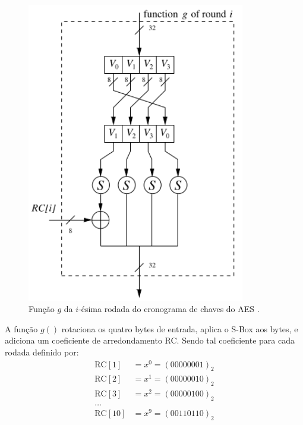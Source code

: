 \begin{frame}[allowframebreaks]
 \framebreak

\begin{figure}[h]
\centering
\includegraphics[width=0.85\textwidth,height=0.65\textheight,keepaspectratio]{figures/AES-keyschedule-g.png}
\caption{Função $g$ da $i$-ésima rodada do cronograma de chaves do AES \cite{paar2014}.}
\label{fig-AES-mixcolumns}
\end{figure}
A função $g()$ rotaciona os quatro bytes de entrada, aplica o S-Box aos bytes, e adiciona um coeficiente de arredondamento RC.
Sendo tal coeficiente para cada rodada definido por:
\begin{align}
\text{RC}[1] &= x^0 = (0000 0001)_2 \\
\text{RC}[2] &= x^1 = (0000 0010)_2 \\
\text{RC}[3] &= x^2 = (0000 0100)_2 \\
\ldots \\
\text{RC}[10] &= x^9 = (0011 0110)_ 2
\end{align}

\end{frame}


